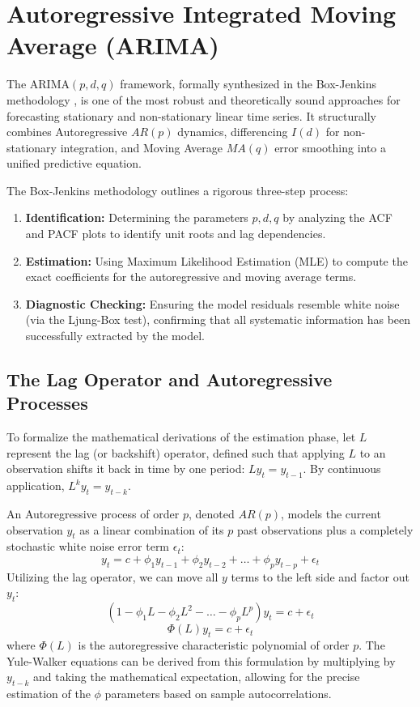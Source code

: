 \documentclass[11pt, a4paper]{report}
\begin{document}
\section{Autoregressive Integrated Moving Average (ARIMA)}
The ARIMA$(p, d, q)$ framework, formally synthesized in the Box-Jenkins methodology \cite{BoxJenkins1970}, is one of the most robust and theoretically sound approaches for forecasting stationary and non-stationary linear time series. It structurally combines Autoregressive $AR(p)$ dynamics, differencing $I(d)$ for non-stationary integration, and Moving Average $MA(q)$ error smoothing into a unified predictive equation.

The Box-Jenkins methodology outlines a rigorous three-step process:
\begin{enumerate}
    \item \textbf{Identification:} Determining the parameters $p, d, q$ by analyzing the ACF and PACF plots to identify unit roots and lag dependencies.
    \item \textbf{Estimation:} Using Maximum Likelihood Estimation (MLE) to compute the exact coefficients for the autoregressive and moving average terms.
    \item \textbf{Diagnostic Checking:} Ensuring the model residuals resemble white noise (via the Ljung-Box test), confirming that all systematic information has been successfully extracted by the model.
\end{enumerate}

\subsection{The Lag Operator and Autoregressive Processes}
To formalize the mathematical derivations of the estimation phase, let $L$ represent the lag (or backshift) operator, defined such that applying $L$ to an observation shifts it back in time by one period: $L y_t = y_{t-1}$. By continuous application, $L^k y_t = y_{t-k}$.

An Autoregressive process of order $p$, denoted $AR(p)$, models the current observation $y_t$ as a linear combination of its $p$ past observations plus a completely stochastic white noise error term $\epsilon_t$:
\begin{equation}
    y_t = c + \phi_1 y_{t-1} + \phi_2 y_{t-2} + \dots + \phi_p y_{t-p} + \epsilon_t
\end{equation}
Utilizing the lag operator, we can move all $y$ terms to the left side and factor out $y_t$:
\begin{equation}
    \left(1 - \phi_1 L - \phi_2 L^2 - \dots - \phi_p L^p\right) y_t = c + \epsilon_t 
\end{equation}
\begin{equation}
    \Phi(L) y_t = c + \epsilon_t
\end{equation}
where $\Phi(L)$ is the autoregressive characteristic polynomial of order $p$. The Yule-Walker equations can be derived from this formulation by multiplying by $y_{t-k}$ and taking the mathematical expectation, allowing for the precise estimation of the $\phi$ parameters based on sample autocorrelations.
\end{document}
